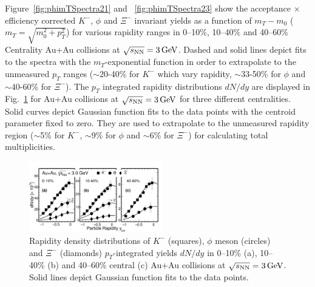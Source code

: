\documentclass[aps,tightenlines,superscriptaddress,twocolumn]{revtex4-1}
\begin{document}
Figure~\ref{fig:phimTSpectra21} and ~\ref{fig:phimTSpectra23} show the acceptance $\times$ efficiency corrected $K^-$, $\phi$ and $\Xi^-$ invariant yields as a function of $m_T-m_0$ ($m_T = \sqrt{m_{0}^{2}+p_{T}^2}$) for various rapidity ranges in 0--10\%, 10--40\% and 40--60\% Centrality Au+Au collisions at ${\sqrt{s_{\rm NN}} = \rm{3\,GeV}}$. 
Dashed and solid lines depict fits to the spectra with the $m_T$-exponential function in order to extrapolate to the unmeasured $p_T$ ranges ($\sim$20-40\% for $K^-$ which vary rapidity, $\sim$33-50\% for $\phi$ and $\sim$40-60\% for $\Xi^-$). The $p_T$ integrated rapidity distributions $dN/dy$ are displayed in Fig.~\ref{fig:phiYSpectra} for Au+Au collisions at ${\sqrt{s_{\rm NN}} = \rm{3\,GeV}}$ for three different centralities. 
Solid curves depict Gaussian function fits to the data points with the centroid parameter fixed to zero. They are used to extrapolate to the unmeasured rapidity region ($\sim$5\% for $K^-$, $\sim$9\% for $\phi$ and $\sim$6\% for $\Xi^-$) for calculating total multiplicities.




\begin{figure}
\centering
\hspace*{-4mm}
\includegraphics[width=0.52\textwidth]{fig3_dndy-eps-converted-to.pdf}
  \caption{Rapidity density distributions of $K^-$ (squares), $\phi$ meson (circles) and $\Xi^-$ (diamonds) $p_T$-integrated yields $dN/dy$ in 0--10\% (a), 10--40\% (b) and 40--60\% central (c) Au+Au collisions at ${\sqrt{s_{\rm NN}} = \rm{3\,GeV}}$.
  Solid lines depict Gaussian function fits to the data points.}
\label{fig:phiYSpectra} 
\end{figure}
\end{document}
